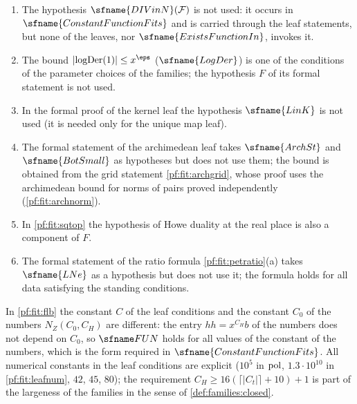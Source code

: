 \begin{remark}\label{pf:fit:rem:unused}
\begin{enumerate}[label=(\alph*)]
\item The hypothesis $\sfname{DIVinN}(\mathcal F)$ is not used: it occurs in $\sfname{ConstantFunctionFits}$ and is
carried through the leaf statements, but none of the leaves, nor $\sfname{ExistsFunctionIn}$, invokes it.
\item The bound $|\mathrm{logDer}(1)|\le x^\eps$ ($\sfname{LogDer}$) is one of the conditions of the parameter choices of
the families; the hypothesis $F$ of its formal statement is not used.
\item In the formal proof of the kernel leaf the hypothesis $\sfname{LinK}$ is not used (it is needed only for the unique map
leaf).
\item The formal statement of the archimedean leaf takes $\sfname{ArchSt}$ and $\sfname{BotSmall}$ as hypotheses but does
not use them; the bound is obtained from the grid statement \cref{pf:fit:archgrid}, whose proof uses the archimedean bound for
norms of pairs proved independently (\cref{pf:fit:archnorm}).
\item In \cref{pf:fit:sqtop} the hypothesis of Howe duality at the real place is also a component of $F$.
\item The formal statement of the ratio formula \cref{pf:fit:petratio}(a) takes $\sfname{LNe}$ as a hypothesis but does not use it;
the formula holds for all data satisfying the standing conditions.
\end{enumerate}
\end{remark}

\begin{remark}\label{pf:fit:rem:const}
In \cref{pf:fit:flb} the constant $C$ of the leaf conditions and the constant $C_0$ of the numbers $N_Z(C_0,C_H)$ are
different: the entry $hh=x^{C_H}b$ of the numbers does not depend on $C_0$, so $\fitFUN$ holds for all values of the constant
of the numbers, which is the form required in $\sfname{ConstantFunctionFits}$. All numerical constants in the leaf conditions
are explicit ($10^5$ in $\operatorname{pol}$, $1.3\cdot10^{10}$ in \cref{pf:fit:leafnum}, $42$, $45$, $80$); the requirement
$C_H\ge16(\lceil|C_t|\rceil+10)+1$ is part of the largeness of the families in the sense of \cref{def:families:closed}.
\end{remark}

